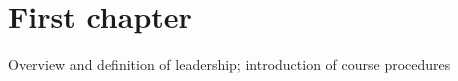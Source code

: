 

\section{First chapter}
Overview and definition of leadership; introduction of course procedures


